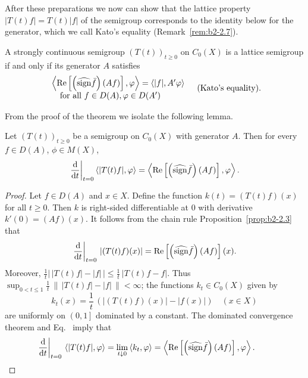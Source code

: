 After these preparations we now can show that the lattice property $|T(t)f| = T(t)|f|$ of the semigroup corresponds to the identity  below for the generator, which we call Kato's equality (\cf Remark~\ref{rem:b2-2.7}).
\begin{theorem}\label{thm:b2-2.5}
A strongly continuous semigroup $(T(t))_{t \geq 0}$ on $C_{0}(X)$ is a lattice semigroup if and only if its generator $A$ satisfies
\begin{equation}\label{eq:b2-2.9}
\begin{array}{l}
\left\langle \Re\left[\left(\widehat{\sign} \bar{f}\right)(Af)\right],\phi \right\rangle = \langle |f|,A'\phi \rangle \\
\text{\quad for all } f \in D(A), \phi \in D(A') 
\end{array} \quad \text{(Kato's equality)}.
\end{equation}
\end{theorem}
From the proof of the theorem we isolate the following lemma.
\begin{lemma}\label{lem:b2-2.6}
Let $(T(t))_{t \geq 0}$ be a semigroup on $C_{0}(X)$ with generator $A$.
Then for every $f \in D(A)$, $\phi \in M(X)$,
\begin{equation}\label{eq:b2-2.10}
\left.\frac{\mathrm{d}}{\dt}
\right|_{t = 0} \langle |T(t)f|,\phi \rangle = \left\langle \Re\left[\left(\widehat{\sign} \bar{f}\right)(Af)\right],\phi \right\rangle.
\end{equation}
\end{lemma}
\begin{proof}
Let $f \in D(A)$ and $x \in X$.
Define the function $k(t) = (T(t)f)(x)$ for all $t \geq 0$.
Then $k$ is right-sided differentiable at $0$ with derivative $k'(0) = (Af)(x)$.
It follows from the chain rule Proposition~\ref{prop:b2-2.3} that
\begin{equation}\label{eq:b2-2.11}
\left.\frac{\mathop{}\!\mathrm{d}{}}{\mathop{}\!\mathrm{d}{t}}
\right|_{t = 0}\, |(T(t)f)(x)| = \mathop{}\!\mathrm{Re}\left[\left(\widehat{\operatorname{sign}} \bar{f}\right)(Af)\right](x).
\end{equation}
Moreover, $\frac{1}{t} \left|\, |T(t)f| - |f| \, \right| \leq \frac{1}{t}\, |T(t)f - f|$.
Thus $\sup_{0 < t \leq 1} \frac{1}{t}\, \|\, |T(t)f| - |f|\, \| < \infty$; \ie  the functions $k_{t} \in C_{0}(X)$ given by
\begin{equation}\label{eq:b2-2.12}
k_{t}(x) = \frac{1}{t}\,(|(T(t)f)(x)| - |f(x)|) \quad (x \in X)
\end{equation}
are uniformly on $\left(0,1\right]$ dominated by a constant.
The dominated convergence theorem and Eq.~ imply that
\begin{align*}
\left.\frac{\diff{}}{\dt}\right|_{t=0}\, \langle |T(t)f|,\phi \rangle = \lim_{t \downarrow 0}\, \langle k_{t},\phi \rangle = \left\langle \Re\left[\left(\widehat{\sign} \bar{f}\right)(Af)\right],\phi \right\rangle .
\tag*{\qedsymbol}%
\end{align*}
\let\qedsymbol\relax
\end{proof}
